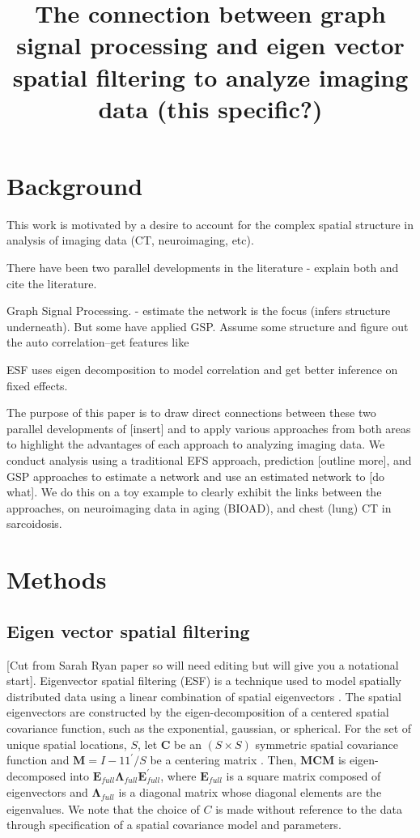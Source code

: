 \documentclass[12pt]{article}
\begin{document}
\title{The connection between graph signal processing and eigen vector spatial filtering to analyze imaging data (this specific?)}
\maketitle

\section{Background}

This work is motivated by a desire to account for the complex spatial structure in analysis of imaging data (CT, neuroimaging, etc).

There have been two parallel developments in the literature - explain both and cite the literature.

Graph Signal Processing.  - estimate the network is the focus (infers structure underneath).  But some have applied GSP.  Assume some structure and figure out the auto correlation--get features like 

ESF uses eigen decomposition to model correlation and get better inference on fixed effects.

The purpose of this paper is to draw direct connections between these two parallel developments of [insert] and to apply various approaches from both areas to highlight the advantages of each approach to analyzing imaging data. We conduct analysis using a traditional EFS approach, prediction [outline more], and GSP approaches to estimate a network and use an estimated network to [do what]. We do this on a toy example to clearly exhibit the links between the approaches, on neuroimaging data in aging (BIOAD), and chest (lung) CT in sarcoidosis.

\section{Methods}
\subsection{Eigen vector spatial filtering}
[Cut from Sarah Ryan paper so will need editing but will give you a notational start]. Eigenvector spatial filtering (ESF) is a technique used to model spatially distributed data using a linear combination of spatial eigenvectors \citep{griffith1996spatial}. The spatial eigenvectors are constructed by the eigen-decomposition of a centered spatial covariance function, such as the exponential, gaussian, or spherical.  For the set of unique spatial locations, $S$, let $\mathbf{C}$ be an $(S \times S)$ symmetric spatial covariance function and $\mathbf{M}=I - 11^\prime/S$ be a centering matrix \citep{griffith1996spatial}. Then, $\mathbf{M} \mathbf{C} \mathbf{M}$ is eigen-decomposed into $\mathbf{E}_\textit{full} \mathbf{\Lambda}_\textit{full} \mathbf{E}_\textit{full}^\prime$, where $\mathbf{E}_\textit{full}$ is a square matrix composed of eigenvectors and $\mathbf{\Lambda}_\textit{full}$ is a diagonal matrix whose diagonal elements are the eigenvalues. We note that the choice of $C$ is made without reference to the data through specification of a spatial covariance model and parameters. 
\end{document}

